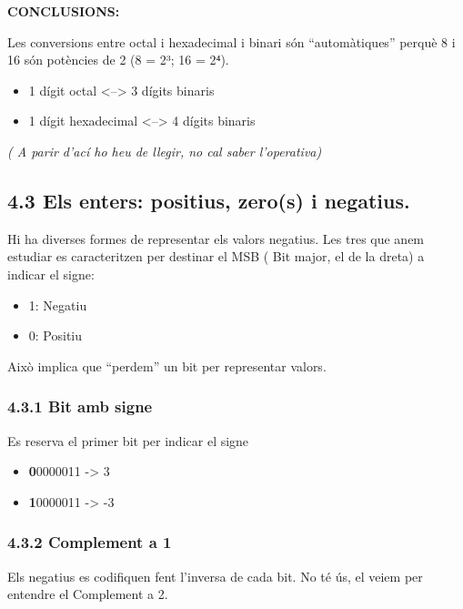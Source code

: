 \documentclass[
  12 pt,
  a4paper,
]{article}
\providecommand{\tightlist}{%
  \setlength{\itemsep}{0pt}\setlength{\parskip}{0pt}}
\begin{document}
\textbf{CONCLUSIONS:}

Les conversions entre octal i hexadecimal i binari són ``automàtiques''
perquè 8 i 16 són potències de 2 (8 = 2³; 16 = 2⁴).

\begin{itemize}
\tightlist
\item
  1 dígit octal \textless--\textgreater{} 3 dígits binaris
\item
  1 dígit hexadecimal \textless--\textgreater{} 4 dígits binaris
\end{itemize}

\emph{( A parir d'ací ho heu de llegir, no cal saber l'operativa)}

\subsection{4.3 Els enters: positius, zero(s) i
negatius.}\label{els-enters-positius-zeros-i-negatius.}

Hi ha diverses formes de representar els valors negatius. Les tres que
anem estudiar es caracteritzen per destinar el MSB ( Bit major, el de la
dreta) a indicar el signe:

\begin{itemize}
\item
  1: Negatiu
\item
  0: Positiu
\end{itemize}

Això implica que ``perdem'' un bit per representar valors.

\subsubsection{4.3.1 Bit amb signe}\label{bit-amb-signe}

Es reserva el primer bit per indicar el signe

\begin{itemize}
\item
  \textbf{0}0000011 -\textgreater{} 3
\item
  \textbf{1}0000011 -\textgreater{} -3
\end{itemize}

\subsubsection{4.3.2 Complement a 1}\label{complement-a-1}

Els negatius es codifiquen fent l'inversa de cada bit. No té ús, el
veiem per entendre el Complement a 2.
\end{document}
